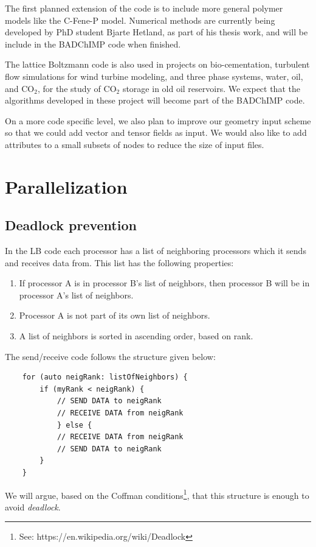 \documentclass[11pt,a4paper]{report}
\begin{document}
The first planned extension of the code is to include more general polymer models like the C-Fene-P model. Numerical methods are currently being developed by PhD student Bjarte Hetland, as part of his thesis work, and will be include in the BADChIMP code when finished. 

The lattice Boltzmann code is also used in projects on bio-cementation, turbulent flow simulations for wind turbine modeling, and three phase systems, water, oil, and CO$_2$, for the study of CO$_2$ storage in old oil reservoirs. We expect that the algorithms developed in these project will become part of the BADChIMP code.   

On a more code specific level, we also plan to improve our geometry input scheme so that we could add vector and tensor fields as input. We would also like to add attributes to a small subsets of nodes to reduce the size of input files.  


\appendix


\chapter{Parallelization}\label{sec:parallelization}

\section{Deadlock prevention}
In the LB code each processor has a list of neighboring processors which it sends and receives data from. This list has the following properties:
\begin{enumerate}
	\item If processor A is in processor B's list of neighbors, then processor B will be in
	processor A's list of neighbors.
	\item Processor A is not part of its own list of neighbors.
	\item A list of neighbors is sorted in ascending order, based on rank.
\end{enumerate}
The send/receive code follows the structure given below:
\begin{verbatim}
    for (auto neigRank: listOfNeighbors) {
        if (myRank < neigRank) {
            // SEND DATA to neigRank
            // RECEIVE DATA from neigRank
            } else {
            // RECEIVE DATA from neigRank
            // SEND DATA to neigRank
        }
    }
\end{verbatim}
We will argue, based  on the Coffman conditions\footnote{See: https://en.wikipedia.org/wiki/Deadlock}, that this structure is enough to avoid \emph{deadlock}. 
\end{document}
